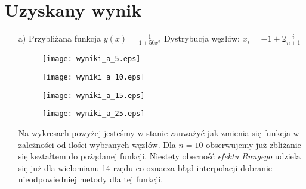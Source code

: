 \documentclass{article}
\begin{document}
  \section{Uzyskany wynik}

  \begin{enumerate}
    \item[a)] Przybliżana funkcja $y(x) = \frac{1}{1+50x^2}$ \qquad Dystrybucja węzłów: $x_i = -1 + 2\frac{i}{n+1}$ \\
    \begin{figure}[!ht]
      \begin{minipage}{0.5\textwidth}
        \centering
        \texttt{[image: wyniki\_a\_5.eps]}
      \end{minipage}
      \begin{minipage}{0.5\textwidth}
        \centering
        \texttt{[image: wyniki\_a\_10.eps]}
      \end{minipage}
    \end{figure}
    \begin{figure}[!ht]
      \begin{minipage}{0.5\textwidth}
        \centering
        \texttt{[image: wyniki\_a\_15.eps]}
      \end{minipage}
      \begin{minipage}{0.5\textwidth}
        \centering
        \texttt{[image: wyniki\_a\_25.eps]}
      \end{minipage}
    \end{figure}

    \begin{minipage}{\textwidth}
      Na wykresach powyżej jesteśmy w stanie zauważyć jak zmienia się funkcja w zależności od ilości wybranych węzłów. Dla $n = 10$ obserwujemy już zbliżanie się kształtem do pożądanej funkcji. Niestety obecność \textit{efektu Rungego} udziela się już dla wielomianu 14 rzędu co oznacza błąd interpolacji dobranie nieodpowiedniej metody dla tej funkcji.
  \end{minipage}


\end{enumerate}
\end{document}
